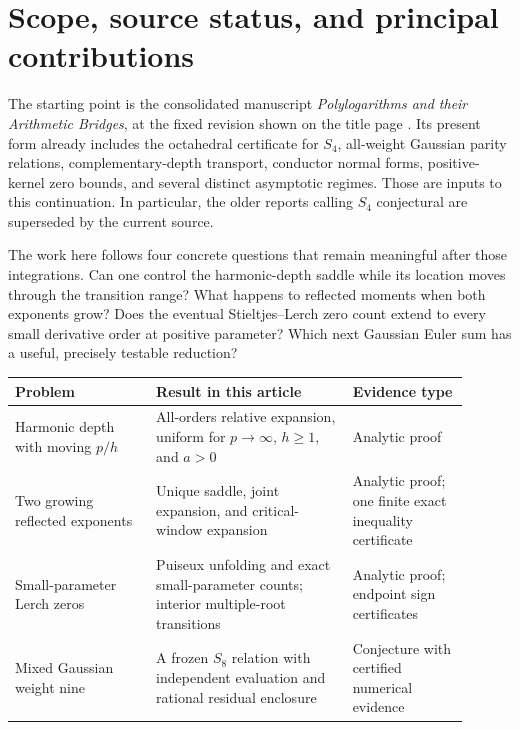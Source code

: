 \documentclass[11pt,letterpaper]{article}
\numberwithin{equation}{section}
\theoremstyle{plain}
\theoremstyle{definition}
\theoremstyle{remark}
\begin{document}
\tableofcontents
\newpage

\section{Scope, source status, and principal contributions}
\label{cont26:sec:scope}

The starting point is the consolidated manuscript
\emph{Polylogarithms and their Arithmetic Bridges}, at the fixed revision
shown on the title page \cite{ProveIt}. Its present form already includes
the octahedral certificate for \(S_4\), all-weight Gaussian parity
relations, complementary-depth transport, conductor normal forms,
positive-kernel zero bounds, and several distinct asymptotic regimes.
Those are inputs to this continuation. In particular, the older reports
calling \(S_4\) conjectural are superseded by the current source.

The work here follows four concrete questions that remain meaningful
after those integrations. Can one control the harmonic-depth saddle
while its location moves through the transition range? What happens to
reflected moments when both exponents grow? Does the eventual
Stieltjes--Lerch zero count extend to every small derivative order at
positive parameter? Which next Gaussian Euler sum has a useful,
precisely testable reduction?

\begin{center}
\small
\begin{tabular}{>{\raggedright\arraybackslash}p{0.28\linewidth}>{\raggedright\arraybackslash}p{0.39\linewidth}>{\raggedright\arraybackslash}p{0.23\linewidth}}
\toprule
Problem & Result in this article & Evidence type\\
\midrule
Harmonic depth with moving \(p/h\) &
All-orders relative expansion, uniform for \(p\to\infty\),
\(h\geq1\), and \(a>0\) &
Analytic proof\\[0.35em]
Two growing reflected exponents &
Unique saddle, joint expansion, and critical-window expansion &
Analytic proof; one finite exact inequality certificate\\[0.35em]
Small-parameter Lerch zeros &
Puiseux unfolding and exact small-parameter counts; interior
multiple-root transitions &
Analytic proof; endpoint sign certificates\\[0.35em]
Mixed Gaussian weight nine &
A frozen \(S_8\) relation with independent evaluation and
rational residual enclosure &
Conjecture with certified numerical evidence\\
\bottomrule
\end{tabular}
\end{center}
\end{document}
